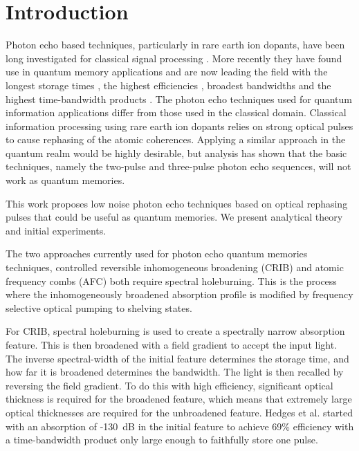 \documentclass[superscriptaddress,pra,twocolumn,showpacs,amsmath,amssymb,aps,a4paper]{revtex4}
\begin{document}
\section{Introduction}

Photon echo based techniques, particularly in rare earth ion dopants,
have been long investigated for classical signal processing
\cite{moss82}.  More recently they have found use in quantum
memory applications and are now leading the field with the
longest storage times \cite{frav05,stopped}, the highest efficiencies
\cite{hedg10}, broadest bandwidths \cite{sagl10} and the highest
time-bandwidth products \cite{usma10}.  The photon echo techniques
used for quantum information applications differ from those
used in the classical domain.  Classical information processing
using rare earth ion dopants relies on strong optical pulses to cause
rephasing of the atomic coherences. Applying a similar approach in the quantum realm would be
highly desirable, but analysis has shown that the
basic techniques, namely the two-pulse \cite{ledi10,rugg08} and three-pulse \cite{sang10} photon echo sequences, will not work as quantum memories.

This work proposes low noise photon echo techniques based on optical
rephasing pulses that could be useful as quantum memories. We
present analytical theory and initial experiments.

The two approaches currently used for photon echo quantum memories
techniques, controlled reversible inhomogeneous broadening
(CRIB)\cite{mois01,krau06,alex06,long08,hete08,hedg10} and atomic
frequency combs (AFC)\cite{ried08,afze09} both require spectral
holeburning. This is the process where the inhomogeneously broadened
absorption profile is modified by frequency selective optical pumping
to shelving states.

For CRIB, spectral holeburning is used to create a spectrally narrow
absorption feature.  This is then broadened with a field gradient to
accept the input light. The inverse spectral-width of the initial
feature determines the storage time, and how far it is broadened
determines the
bandwidth. The light is then recalled by reversing the field
gradient. To do this with high efficiency, significant optical
thickness is required for the broadened feature, which means that
extremely large optical thicknesses are required for the unbroadened
feature. Hedges et al.\cite{hedg10} started with an absorption of
-130~dB in the initial feature to achieve 69\% efficiency with a
time-bandwidth product only large enough to faithfully store one
pulse.
\end{document}
